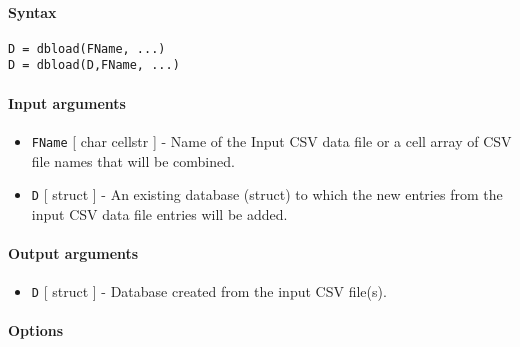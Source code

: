 


	\paragraph{Syntax}\label{syntax}

\begin{verbatim}
D = dbload(FName, ...)
D = dbload(D,FName, ...)
\end{verbatim}

\paragraph{Input arguments}\label{input-arguments}

\begin{itemize}
\item
  \texttt{FName} {[} char \textbar{} cellstr {]} - Name of the Input CSV
  data file or a cell array of CSV file names that will be combined.
\item
  \texttt{D} {[} struct {]} - An existing database (struct) to which the
  new entries from the input CSV data file entries will be added.
\end{itemize}

\paragraph{Output arguments}\label{output-arguments}

\begin{itemize}
\itemsep1pt\parskip0pt
\item
  \texttt{D} {[} struct {]} - Database created from the input CSV
  file(s).
\end{itemize}

\paragraph{Options}\label{options}

